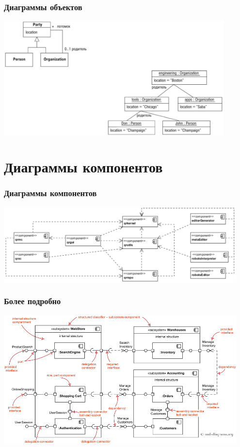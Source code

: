 \documentclass{../../slides-style}
\begin{document}
    \begin{frame}
        \frametitle{Диаграммы объектов}
        \begin{center}
            \includegraphics[width=0.9\textwidth]{objectDiagrams.png}
        \end{center}
    \end{frame}

    \section{Диаграммы компонентов}
    
    \begin{frame}
        \frametitle{Диаграммы компонентов}
        \begin{center}
            \includegraphics[width=0.95\textwidth]{componentDiagrams.png}
        \end{center}
    \end{frame}

    \begin{frame}
        \frametitle{Более подробно}
        \begin{center}
            \includegraphics[width=0.95\textwidth]{componentDiagramsOverview.png}
        \end{center}
    \end{frame}
\end{document}
